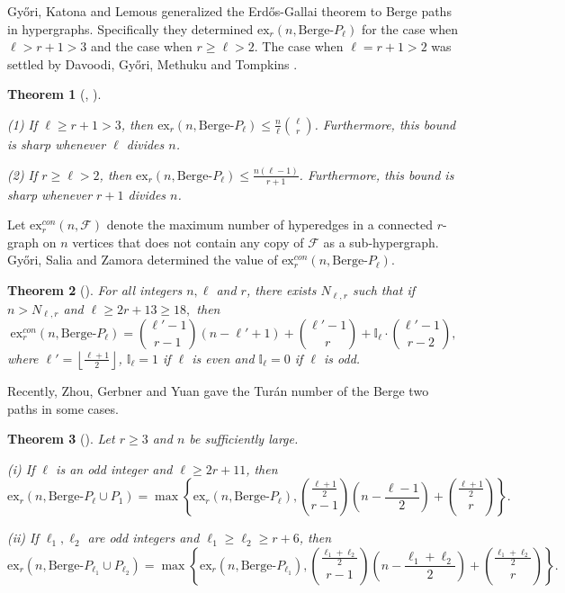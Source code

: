 \documentclass[12pt]{article}%
\newtheorem{theorem}{Theorem}[section]
\newcommand{\ber}{\text{Berge-}}
\newcommand{\lf}{\left\lfloor}
\newcommand{\rf}{\right\rfloor}
\newcounter{cases}
\begin{document}
Gy\H{o}ri, Katona and Lemous \cite{gyHori2016hypergraph} generalized the Erd\H{o}s-Gallai theorem to Berge paths in hypergraphs. Specifically they determined $\mathrm{ex}_{r}(n,\ber P_{\ell})$ for the case when $\ell>r+1>3$ and the case when $r\geq\ell>2$. The case when $\ell=r+1>2$ was settled by Davoodi, Gy\H{o}ri, Methuku and Tompkins
\cite{DavoodiGyoriMethukuTompkins2018}.
\begin{theorem}[\cite{gyHori2016hypergraph},
\cite{DavoodiGyoriMethukuTompkins2018}]
\label{thm: turan of BPl}

    (1) If $\ell\geq r+1>3$, then $\mathrm{ex}_r(n,\ber P_\ell)\leq \frac{n}{\ell}{\ell\choose r}$. Furthermore, this bound is sharp whenever $\ell$ divides $n$.

    \noindent(2) If $r\geq \ell>2$, then $\mathrm{ex}_r(n,\ber P_\ell)\leq \frac{n(\ell-1)}{r+1}$. Furthermore, this bound is sharp whenever $r+1$ divides $n$.
\end{theorem}
Let $\mathrm{ex}_r^{con}(n,\mathcal{F})$ denote the maximum number of hyperedges in a connected $ r$-graph on $n$ vertices that does not contain any copy of $\mathcal{F}$ as a sub-hypergraph.
Gy\H{o}ri, Salia and Zamora \cite{gyHori2021connected} determined the value of $\mathrm{ex}_r^{con}(n,\ber P_\ell)$.
\begin{theorem}[\cite{gyHori2021connected}]\label{thm: connect Pl}
    For all integers $n,\ell$ and $r$, there exists $N_{\ell,r}$ such that if $n>N_{\ell,r}$ and $\ell\geq 2r+13\geq 18,$ then
    $$\mathrm{ex}_r^{con}(n,\ber P_\ell)=\binom{\ell'-1}{r-1}(n-\ell'+1)+\binom{\ell'-1}{r}+\mathbb{I}_\ell\cdot\binom{\ell'-1}{r-2},$$
    where $\ell'=\lf\frac{\ell+1}{2}\rf$, $\mathbb{I}_\ell=1$ if $\ell$ is even and $\mathbb{I}_\ell=0$ if $\ell$ is odd.
\end{theorem}
Recently, 
Zhou, Gerbner and Yuan \cite{Zhou2025OnTP} gave the Tur\'an number of the Berge two paths in some cases.
\begin{theorem}[\cite{Zhou2025OnTP}]\label{thm: two berge path}
    Let $r\geq 3$ and $n$ be sufficiently large.
    \par\noindent
    (i) If $\ell$ is an odd integer and $\ell\geq 2r+11$, then
    $$\mathrm{ex}_{r}(n,\ber P_{\ell}\cup P_{1})=\max\left\{\mathrm{ex}_{r}(n,\ber P_{\ell}),\binom{\frac{\ell+1}{2}}{r-1}(n-\frac{\ell-1}{2})+\binom{\frac{\ell+1}{2}}{r}\right\}.$$
    \par\noindent
    (ii) If $\ell_1,\ell_2$ are odd integers and $\ell_1\geq \ell_2\geq r+6$, then
    $$\mathrm{ex}_{r}(n,\ber P_{\ell_1}\cup P_{\ell_2})=\max\left\{\mathrm{ex}_{r}(n,\ber P_{\ell_1}),\binom{\frac{\ell_1+\ell_2}{2}}{r-1}(n-\frac{\ell_1+\ell_2}{2})+\binom{\frac{\ell_1+\ell_2}{2}}{r}\right\}.$$
\end{theorem}
\end{document}
